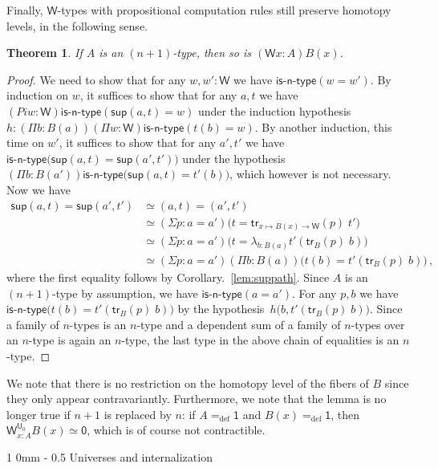 \documentclass[10pt,a4paper,oneside,reqno]{amsart}
\makeatletter
\numberwithin{equation}{section}
\renewcommand{\section}{\@startsection
  {section}%
   {1}%
  {0mm}%
   {-\baselineskip}%
  {0.5\baselineskip}%
   {\Large\bfseries}}%
\theoremstyle{mythm}
\newtheorem{theorem}{Theorem}[section]
\theoremstyle{mydef}
\theoremstyle{myrmk}
\newcommand{\defeq}{=_{\mathrm{def}}}
\newcommand{\isntype}[1]{\mathsf{is}\text{-}\mathsf{#1}\text{-}\mathsf{type}}
\newcommand{\trans}{\mathsf{tr}}
\newcommand{\lam}[1]{\lambda_{#1}}
\newcommand{\W}{\mathsf{W}}
\newcommand{\wsup}{\mathsf{sup}}
\newcommand{\one}{\mathsf{1}}
\newcommand{\zero}{\mathsf{0}}
\newcommand{\UU}{\mathsf{U}}
\makeatother
\begin{document}
Finally, $\W$-types with propositional computation rules still preserve homotopy levels, in the following sense.

\begin{theorem}
If $A$ is an $(n+1)$-type, then so is $(\W x:A)B(x)$.
\end{theorem}


\begin{proof}
We need to show that for any $w, w' : \W$ we have $\isntype{n}(w = w')$. By induction on $w$, it suffices to show that for any $a,t$ we have $(Pi w:\W) \isntype{n}(\wsup(a,t) = w)$ under the induction hypothesis $h : (\Pi b:B(a)) (\Pi w:\W) \isntype{n}(t(b) = w)$.  By another induction, this time on $w'$, it suffices to show that for any $a',t'$ we have
$\isntype{n}\big(\wsup(a,t) = \wsup(a',t')\big)$ under the hypothesis $(\Pi b:B(a')) \isntype{n}\big(\wsup(a,t) = t'(b)\big)$, which however is not necessary. Now we have
\begin{align*} 
\wsup(a,t) = \wsup(a',t') 
& \simeq (a,t) = (a',t') \\
& \simeq (\Sigma p : a = a') \big(t = \trans_{x \mapsto B(x) \to \W}(p) \; t'\big) \\
& \simeq  (\Sigma p : a = a')  \big(t = \lam{b:B(a)} t'(\trans_B(p) \; b)\big) \\
& \simeq (\Sigma p : a = a') (\Pi b:B(a)) \big(t(b) = t'(\trans_B(p) \; b)\big) \, , 
\end{align*}
where the first equality follows by Corollary.~\ref{lem:suppath}. Since $A$ is an $(n+1)$-type by assumption, we have $\isntype{n}(a=a')$. For any $p,b$ we have $\isntype{n}\big(t(b) = t'(\trans_B(p) \; b)\big)$ by the hypothesis~$h\big(b,t'(\trans_B(p) \; b)\big)$. Since a family of $n$-types is an $n$-type and a dependent sum of a family of $n$-types over an $n$-type is again an $n$-type, the last type in the above chain of equalities is an $n$-type. 
\end{proof}

We note that there is no restriction on the homotopy level of the fibers of $B$ since they only appear contravariantly. Furthermore, we note that the lemma is no longer true if $n+1$ is replaced by $n$: if $A \defeq \one$ and $B(x) \defeq \one$, then $\W^{\UU_0}_{x:A} B(x) \simeq \zero$, which is of course not contractible. 

\section{Universes and internalization}
\end{document}
